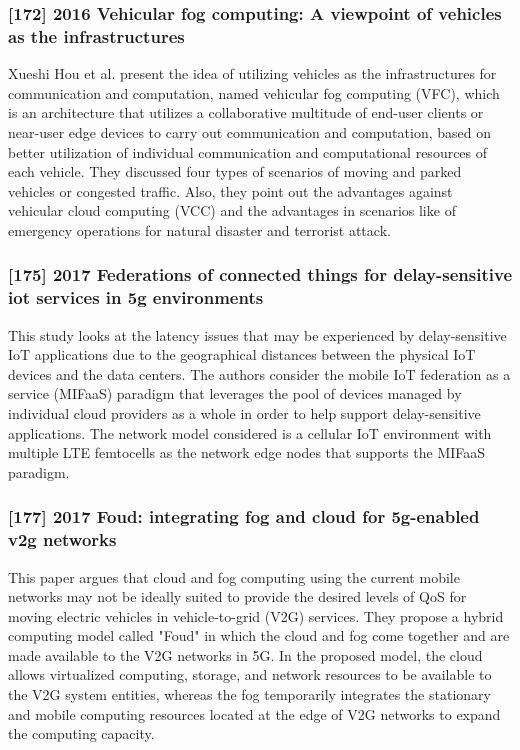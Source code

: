 \subsubsection{[172] 2016 Vehicular fog computing: A viewpoint of vehicles as the infrastructures}
\label{subsec:paper05}
Xueshi Hou et al. \cite{hou2016vehicular} present the idea of utilizing vehicles as the infrastructures for communication and computation, named vehicular fog computing (VFC), which is an architecture that utilizes a collaborative multitude of end-user clients or near-user edge devices to carry out communication and computation, based on better utilization of individual communication and computational resources of each vehicle. They discussed four types of scenarios of moving and parked vehicles or congested traffic. Also, they point out the advantages against vehicular cloud computing (VCC) and the advantages in scenarios like of emergency operations for natural disaster and terrorist attack.

\subsubsection{[175] 2017 Federations of connected things for delay-sensitive iot services in 5g environments}
This study looks at the latency issues that may be experienced by delay-sensitive IoT applications due to the geographical distances between the physical IoT devices and the data centers. The authors consider the mobile IoT federation as a service (MIFaaS) paradigm that leverages the pool of devices managed by individual cloud providers as a whole in order to help support delay-sensitive applications. The network model considered is a cellular IoT environment with multiple LTE femtocells as the network edge nodes that supports the MIFaaS paradigm.

\subsubsection{[177] 2017 Foud: integrating fog and cloud for 5g-enabled v2g networks}
This paper argues that cloud and fog computing using the current mobile networks may not be ideally suited to provide the desired levels of QoS for moving electric vehicles in vehicle-to-grid (V2G) services. They propose a hybrid computing model called "Foud" in which the cloud and fog come together and are made available to the V2G networks in 5G. In the proposed model, the cloud allows virtualized computing, storage, and network resources to be available to the V2G system entities, whereas the fog temporarily integrates the stationary and mobile computing resources located at the edge of V2G networks to expand the computing capacity.

